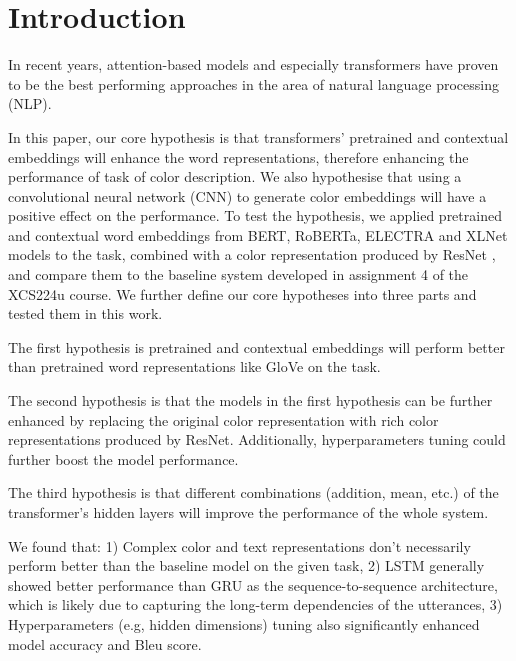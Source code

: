 \section{Introduction}

In recent years, attention-based models and especially transformers have proven to be the best performing approaches in the area of natural language processing (NLP).

\par
In this paper, our core hypothesis is that transformers’ pretrained and contextual embeddings will enhance the word representations, therefore enhancing the performance of task of color description. We also hypothesise that using a convolutional neural network (CNN) to generate color embeddings will have a positive effect on the performance.  To test the hypothesis,  we applied pretrained and contextual word embeddings from BERT, RoBERTa, ELECTRA and XLNet models to the task, combined with a color representation produced by ResNet , and compare them to the baseline system developed in assignment 4 of the XCS224u course. We further define our core hypotheses into three parts and tested them in this work.

\par
The first hypothesis is pretrained and contextual embeddings will perform better than pretrained word representations like GloVe on the task.

\par
The second hypothesis is that the models in the first hypothesis can be further enhanced by replacing the original color representation with rich color representations produced by ResNet. Additionally, hyperparameters tuning could further  boost the model performance.

\par
The third hypothesis is that different combinations (addition, mean, etc.) of the transformer’s hidden layers will improve the performance of the whole system.

\par
We found that: 1) Complex color and text representations don’t necessarily perform better than the baseline model on the given task, 2) LSTM generally showed better performance than GRU as the sequence-to-sequence architecture, which is likely due to capturing the long-term dependencies of the utterances, 3) Hyperparameters (e.g, hidden dimensions) tuning also significantly enhanced model accuracy and Bleu score.

